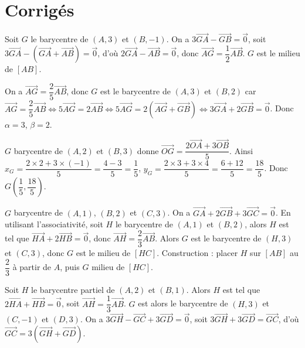 \section{Corrigés}

Soit $G$ le barycentre de $(A,3)$ et $(B,-1)$. On a $3\overrightarrow{GA} - \overrightarrow{GB} = \vec{0}$, soit $3\overrightarrow{GA} - (\overrightarrow{GA} + \overrightarrow{AB}) = \vec{0}$, d'où $2\overrightarrow{GA} - \overrightarrow{AB} = \vec{0}$, donc $\overrightarrow{AG} = \dfrac{1}{2}\overrightarrow{AB}$. $G$ est le milieu de $[AB]$.

On a $\overrightarrow{AG} = \dfrac{2}{5}\overrightarrow{AB}$, donc $G$ est le barycentre de $(A,3)$ et $(B,2)$ car $\overrightarrow{AG} = \dfrac{2}{5}\overrightarrow{AB} \iff 5\overrightarrow{AG} = 2\overrightarrow{AB} \iff 5\overrightarrow{AG} = 2(\overrightarrow{AG} + \overrightarrow{GB}) \iff 3\overrightarrow{GA} + 2\overrightarrow{GB} = \vec{0}$. Donc $\alpha = 3$, $\beta = 2$.

$G$ barycentre de $(A,2)$ et $(B,3)$ donne $\overrightarrow{OG} = \dfrac{2\overrightarrow{OA} + 3\overrightarrow{OB}}{5}$. Ainsi $x_G = \dfrac{2\times 2 + 3\times (-1)}{5} = \dfrac{4 - 3}{5} = \dfrac{1}{5}$, $y_G = \dfrac{2\times 3 + 3\times 4}{5} = \dfrac{6 + 12}{5} = \dfrac{18}{5}$. Donc $G\left(\dfrac{1}{5},\dfrac{18}{5}\right)$.

$G$ barycentre de $(A,1)$, $(B,2)$ et $(C,3)$. On a $\overrightarrow{GA} + 2\overrightarrow{GB} + 3\overrightarrow{GC} = \vec{0}$. En utilisant l'associativité, soit $H$ le barycentre de $(A,1)$ et $(B,2)$, alors $H$ est tel que $\overrightarrow{HA} + 2\overrightarrow{HB} = \vec{0}$, donc $\overrightarrow{AH} = \dfrac{2}{3}\overrightarrow{AB}$. Alors $G$ est le barycentre de $(H,3)$ et $(C,3)$, donc $G$ est le milieu de $[HC]$. Construction : placer $H$ sur $[AB]$ au $\dfrac{2}{3}$ à partir de $A$, puis $G$ milieu de $[HC]$.

Soit $H$ le barycentre partiel de $(A,2)$ et $(B,1)$. Alors $H$ est tel que $2\overrightarrow{HA} + \overrightarrow{HB} = \vec{0}$, soit $\overrightarrow{AH} = \dfrac{1}{3}\overrightarrow{AB}$. $G$ est alors le barycentre de $(H,3)$ et $(C,-1)$ et $(D,3)$. On a $3\overrightarrow{GH} - \overrightarrow{GC} + 3\overrightarrow{GD} = \vec{0}$, soit $3\overrightarrow{GH} + 3\overrightarrow{GD} = \overrightarrow{GC}$, d'où $\overrightarrow{GC} = 3(\overrightarrow{GH} + \overrightarrow{GD})$.

